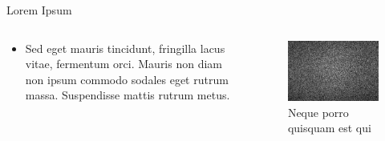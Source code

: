 \documentclass[UKenglish, aspectratio = 169]{beamer}
\begin{document}
\begin{frame}{Lorem Ipsum}
	\begin{columns}
		\begin{column}[T]{0.5\textwidth}
			\vspace*{4ex}
			\begin{itemize}
				\item Sed eget mauris tincidunt, fringilla lacus vitae, fermentum orci. Mauris non diam non ipsum commodo sodales eget rutrum massa. Suspendisse mattis rutrum metus.
			\end{itemize}
		\end{column}
		\begin{column}{0.5\textwidth}
			\begin{figure}
				\centering
				\includegraphics{figs/stock photo.jpg}
				\caption{\tiny{Neque porro quisquam est qui }}
			\end{figure}
		\end{column}
	\end{columns}
\end{frame}
\end{document}
